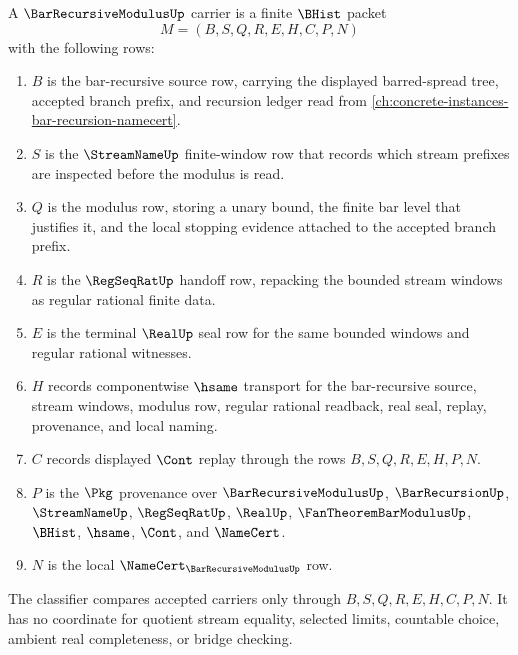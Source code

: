 \begin{definition}
\label{def:bar-recursive-modulus-carrier}
A $\BarRecursiveModulusUp$ carrier is a finite $\BHist$ packet
$$
M=(B,S,Q,R,E,H,C,P,N)
$$
with the following rows:
\begin{enumerate}
\item $B$ is the bar-recursive source row, carrying the displayed barred-spread tree, accepted branch prefix, and recursion ledger read from \autoref{ch:concrete-instances-bar-recursion-namecert}.
\item $S$ is the $\StreamNameUp$ finite-window row that records which stream prefixes are inspected before the modulus is read.
\item $Q$ is the modulus row, storing a unary bound, the finite bar level that justifies it, and the local stopping evidence attached to the accepted branch prefix.
\item $R$ is the $\RegSeqRatUp$ handoff row, repacking the bounded stream windows as regular rational finite data.
\item $E$ is the terminal $\RealUp$ seal row for the same bounded windows and regular rational witnesses.
\item $H$ records componentwise $\hsame$ transport for the bar-recursive source, stream windows, modulus row, regular rational readback, real seal, replay, provenance, and local naming.
\item $C$ records displayed $\Cont$ replay through the rows $B,S,Q,R,E,H,P,N$.
\item $P$ is the $\Pkg$ provenance over $\BarRecursiveModulusUp$, $\BarRecursionUp$, $\StreamNameUp$, $\RegSeqRatUp$, $\RealUp$, $\FanTheoremBarModulusUp$, $\BHist$, $\hsame$, $\Cont$, and $\NameCert$.
\item $N$ is the local $\NameCert_{\BarRecursiveModulusUp}$ row.
\end{enumerate}
The classifier compares accepted carriers only through $B,S,Q,R,E,H,C,P,N$. It has no coordinate for quotient stream equality, selected limits, countable choice, ambient real completeness, or bridge checking.
\end{definition}

